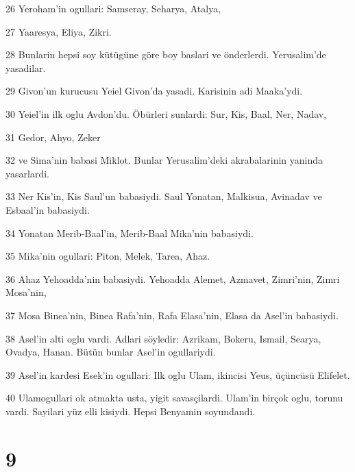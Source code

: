 \par 26 Yeroham'in ogullari: Samseray, Seharya, Atalya,
\par 27 Yaaresya, Eliya, Zikri.
\par 28 Bunlarin hepsi soy kütügüne göre boy baslari ve önderlerdi. Yerusalim'de yasadilar.
\par 29 Givon'un kurucusu Yeiel Givon'da yasadi. Karisinin adi Maaka'ydi.
\par 30 Yeiel'in ilk oglu Avdon'du. Öbürleri sunlardi: Sur, Kis, Baal, Ner, Nadav,
\par 31 Gedor, Ahyo, Zeker
\par 32 ve Sima'nin babasi Miklot. Bunlar Yerusalim'deki akrabalarinin yaninda yasarlardi.
\par 33 Ner Kis'in, Kis Saul'un babasiydi. Saul Yonatan, Malkisua, Avinadav ve Esbaal'in babasiydi.
\par 34 Yonatan Merib-Baal'in, Merib-Baal Mika'nin babasiydi.
\par 35 Mika'nin ogullari: Piton, Melek, Tarea, Ahaz.
\par 36 Ahaz Yehoadda'nin babasiydi. Yehoadda Alemet, Azmavet, Zimri'nin, Zimri Mosa'nin,
\par 37 Mosa Binea'nin, Binea Rafa'nin, Rafa Elasa'nin, Elasa da Asel'in babasiydi.
\par 38 Asel'in alti oglu vardi. Adlari söyledir: Azrikam, Bokeru, Ismail, Searya, Ovadya, Hanan. Bütün bunlar Asel'in ogullariydi.
\par 39 Asel'in kardesi Esek'in ogullari: Ilk oglu Ulam, ikincisi Yeus, üçüncüsü Elifelet.
\par 40 Ulamogullari ok atmakta usta, yigit savasçilardi. Ulam'in birçok oglu, torunu vardi. Sayilari yüz elli kisiydi. Hepsi Benyamin soyundandi.

\chapter{9}

